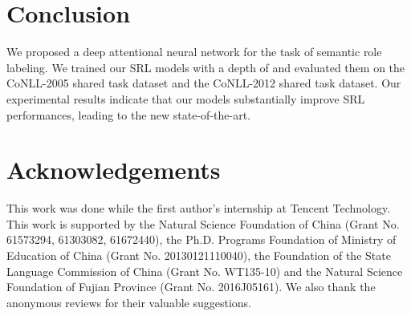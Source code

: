 \documentclass[letterpaper]{article} \usepackage{aaai18}  \usepackage{times}  \usepackage{helvet}  \usepackage{courier}  \usepackage{url}  \usepackage{graphicx}  \frenchspacing  \setlength{\pdfpagewidth}{8.5in}  \setlength{\pdfpageheight}{11in}  \usepackage{latexsym}
\begin{document}
\section{Conclusion}
We proposed a deep attentional neural network for the task of semantic role labeling. We trained our SRL models with a depth of  and evaluated them on the CoNLL-2005 shared task dataset and the CoNLL-2012 shared task dataset. Our experimental results indicate that our models substantially improve SRL performances, leading to the new state-of-the-art.


\section*{Acknowledgements}
This work was done while the first author's internship at Tencent Technology. This work is supported by the Natural Science Foundation of China (Grant No. 61573294, 61303082, 61672440), the Ph.D. Programs Foundation of Ministry of Education of China (Grant No. 20130121110040), the Foundation of the State Language Commission of China (Grant No. WT135-10) and the Natural Science Foundation of Fujian Province (Grant No. 2016J05161). We also thank the anonymous reviews for their valuable suggestions.




\end{document}
